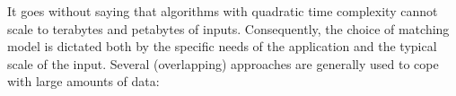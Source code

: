 
It goes without saying that algorithms with quadratic time complexity cannot scale to terabytes and petabytes of inputs. Consequently, the choice of matching model is dictated both by the specific needs of the application and the typical scale of the input.
Several (overlapping) approaches are generally used to cope with large amounts of data:
\begin{itemize}


\end{itemize}

